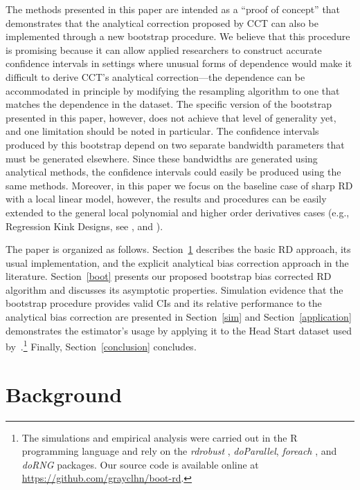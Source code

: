 \documentclass[12pt,fleqn]{article}
\begin{document}
The methods presented in this paper are intended as a ``proof of concept'' that
demonstrates that the analytical correction proposed by CCT can also be
implemented through a new bootstrap procedure. We believe that this procedure is
promising because it can allow applied researchers to construct
accurate confidence intervals in settings where unusual forms of dependence
would make it difficult to derive CCT's analytical correction---the dependence
can be accommodated in principle by modifying the resampling algorithm to one
that matches the dependence in the dataset. The specific version of the bootstrap
presented in this paper, however, does not achieve that level of generality yet,
and one limitation should be noted in particular. The confidence
intervals produced by this bootstrap depend on two separate bandwidth parameters
that must be generated elsewhere. Since these bandwidths are generated using
analytical methods, the confidence intervals could easily be produced using the
same methods. Moreover, in this paper we focus on the baseline case of
sharp RD with a local linear model, however, the results and procedures can be
easily extended to the general local polynomial and higher order derivatives
cases (e.g., Regression Kink Designs, see \citealp{card2009b}, and
\citealp{CardEtAl1,CardEtAl2}).

The paper is organized as follows. Section~\ref{background} describes the basic
RD approach, its usual implementation, and the explicit analytical bias
correction approach in the literature. Section~\ref{boot} presents our proposed
bootstrap bias corrected RD algorithm and discusses its asymptotic
properties. Simulation evidence that the bootstrap procedure provides valid CIs
and its relative performance to the analytical bias correction are presented in
Section~\ref{sim} and Section~\ref{application} demonstrates the estimator's
usage by applying it to the Head Start dataset used
by~\cite{ludwig2007}.\footnote{%
  The simulations and empirical analysis were carried out in the R programming
  language \citep{R} and rely on the \textit{rdrobust} \citep{rdrobust},
  \textit{doParallel}, \textit{foreach} \citep{doparallel,foreach}, and
  \textit{doRNG} \citep{dorng} packages. Our source code is available online
  at \url{https://github.com/grayclhn/boot-rd}.} %
Finally, Section~\ref{conclusion} concludes.

\section{Background}\label{background}
\end{document}
